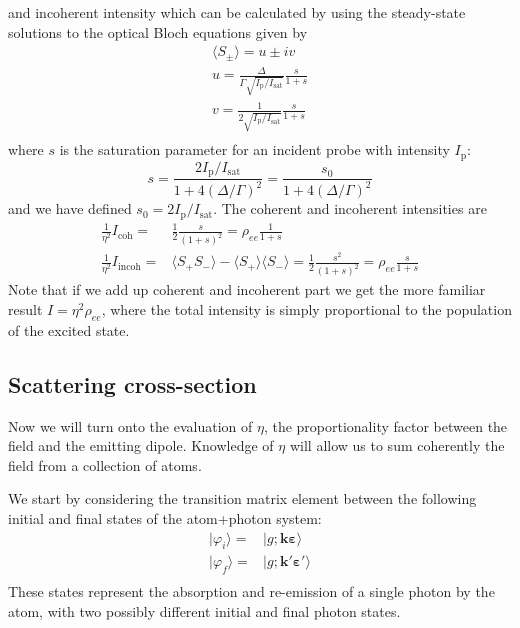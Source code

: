 \documentclass[11pt,letter]{article}
\newcommand{\bv}[1]{\ensuremath{\bm{#1}}}
\newcommand{\iisat}{\ensuremath{I_{\mathrm{p}}/I_{\mathrm{sat}}}}
\begin{document}
and incoherent intensity which can be calculated by using the
steady-state solutions to the optical Bloch equations given by
\begin{gather} 
    \langle S_{\pm} \rangle =  u \pm i v  \\
    u =  \frac{ \Delta }{ \Gamma  \sqrt{ I_{\mathrm{p}} / I_{\mathrm{sat}}} } 
         \frac{s}{ 1 + s } \\
    v =  \frac{ 1 } { 2 \sqrt{ I_{\mathrm{p}} / I_{\mathrm{sat}}} } 
         \frac{s}{1+s} \\
\end{gather}
where $s$ is the saturation parameter for an incident probe with intensity
$I_{\mathrm{p}}$:
\begin{equation}
s = \frac{ 2  \iisat } { 1 + 4(\Delta/\Gamma)^{2} } 
  =  \frac{ s_{0} } { 1 + 4(\Delta/\Gamma)^{2} }
\end{equation}
and we have defined $s_{0} = 2 \iisat$. 
The coherent and incoherent intensities are
\begin{equation}
\begin{split} 
    \frac{1}{\eta^{2}}  I_{\mathrm{coh}} = &
        \frac{1}{2} \frac{s}{(1+s)^{2} } 
      = \rho_{ee}  \frac{1}{1+s} \\
    \frac{1}{\eta^{2}}  I_{\mathrm{incoh}}  = & 
        \langle S_{+}S_{-} \rangle - \langle S_{+} \rangle \langle S_{-} \rangle
      = \frac{1}{2} \frac{s^{2}}{(1+s)^{2}} = \rho_{ee} \frac{s}{1+s}
 \label{eq:coh-incoh} 
\end{split}
\end{equation}
Note that if we add up coherent and incoherent part we get the more familiar
result $I=\eta^{2} \rho_{ee}$, where the total intensity is simply proportional
to the population of the excited state.


\subsection{Scattering cross-section}

Now we will turn onto the evaluation of $\eta$, the proportionality factor
between the field and the emitting dipole.  Knowledge of $\eta$ will allow us
to sum coherently the field from a collection of atoms. 

We start by considering the  transition matrix element between the following
initial and final states of the atom+photon system: 
\begin{equation}
\begin{split}
    | \varphi_{i} \rangle = & | g ; \bv{k}\bv{\varepsilon} \rangle \\
    | \varphi_{f} \rangle = & | g ; \bv{k}'\bv{\varepsilon}' \rangle \\
\end{split}
\end{equation}
These states represent the absorption and re-emission of a single photon by the
atom, with two possibly different initial and final photon states.
 
\end{document}
